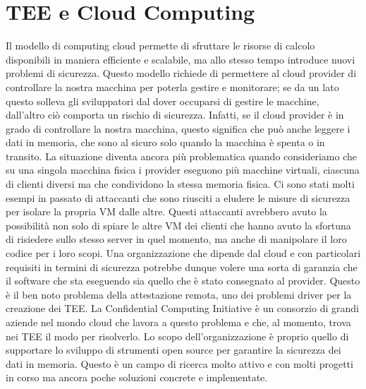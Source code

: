 \documentclass[12pt,italian]{report}
\begin{document}
\section{TEE e Cloud Computing}
\label{sec:tee-e-cloud-computing}
Il modello di computing cloud permette di sfruttare le risorse di calcolo
disponibili in maniera efficiente e scalabile, ma allo stesso tempo introduce
nuovi problemi di sicurezza.
Questo modello richiede di permettere al cloud provider di controllare la
nostra macchina per poterla gestire e monitorare; se da un lato questo solleva
gli sviluppatori dal dover occuparsi di gestire le macchine, dall'altro ciò
comporta un rischio di sicurezza.
Infatti, se il cloud provider è in grado di controllare la nostra macchina,
questo significa che può anche leggere i dati in memoria, che sono al sicuro
solo quando la macchina è spenta o in transito.
La situazione diventa ancora più problematica quando consideriamo che su
una singola macchina fisica i provider eseguono più macchine virtuali, ciascuna
di clienti diversi ma che condividono la stessa memoria fisica.
Ci sono stati molti esempi in passato di attaccanti che sono riusciti a eludere
le misure di sicurezza per isolare la propria VM dalle altre. %
Questi attaccanti avrebbero avuto la possibilità non solo di spiare le altre
VM dei clienti che hanno avuto la sfortuna di risiedere sullo stesso server in
quel momento, ma anche di manipolare il loro codice per i loro scopi.
Una organizzazione che dipende dal cloud e con particolari requisiti in
termini di sicurezza potrebbe dunque volere una sorta di garanzia che il
software che sta eseguendo sia quello che è stato consegnato al provider.
Questo è il ben noto problema della attestazione remota, uno dei problemi
driver per la creazione dei TEE. %
La Confidential Computing Initiative\cite{confidential-computing-initiative}
è un consorzio di grandi aziende nel mondo cloud che lavora a questo problema
e che, al momento, trova nei TEE il modo per risolverlo.
Lo scopo dell'organizzazione è proprio quello di supportare lo sviluppo
di strumenti open source per garantire la sicurezza dei dati in memoria.
Questo è un campo di ricerca molto attivo e con molti progetti in corso ma
ancora poche soluzioni concrete e implementate.
\end{document}
